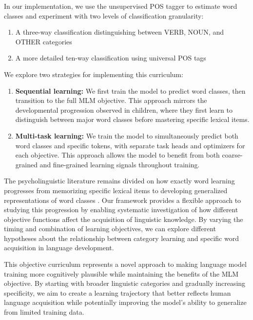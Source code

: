 In our implementation, we use the unsupervised POS tagger to estimate word classes and experiment with two levels of classification granularity:
\begin{enumerate}
    \item A three-way classification distinguishing between VERB, NOUN, and OTHER categories
    \item A more detailed ten-way classification using universal POS tags
\end{enumerate}

We explore two strategies for implementing this curriculum:

\begin{enumerate}
    \item \textbf{Sequential learning:} We first train the model to predict word classes, then transition to the full MLM objective. This approach mirrors the developmental progression observed in children, where they first learn to distinguish between major word classes before mastering specific lexical items.
    
    \item \textbf{Multi-task learning:} We train the model to simultaneously predict both word classes and specific tokens, with separate task heads and optimizers for each objective. This approach allows the model to benefit from both coarse-grained and fine-grained learning signals throughout training.
\end{enumerate}

The psycholinguistic literature remains divided on how exactly word learning progresses from memorizing specific lexical items to developing generalized representations of word classes \cite{clark2015first}. Our framework provides a flexible approach to studying this progression by enabling systematic investigation of how different objective functions affect the acquisition of linguistic knowledge. By varying the timing and combination of learning objectives, we can explore different hypotheses about the relationship between category learning and specific word acquisition in language development.

This objective curriculum represents a novel approach to making language model training more cognitively plausible while maintaining the benefits of the MLM objective. By starting with broader linguistic categories and gradually increasing specificity, we aim to create a learning trajectory that better reflects human language acquisition while potentially improving the model's ability to generalize from limited training data.

